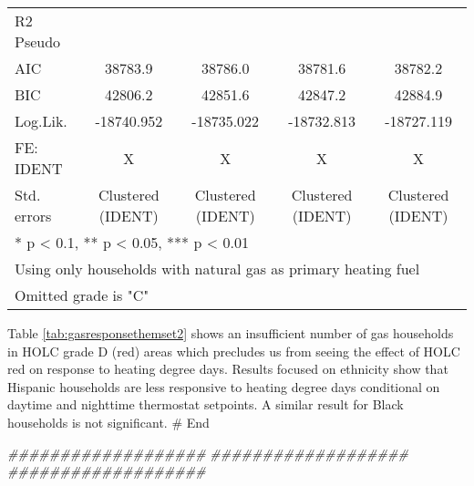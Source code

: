 \documentclass[
]{article}
\newenvironment{Shaded}{\begin{snugshade}}{\end{snugshade}}
\newcommand{\CommentTok}[1]{\textcolor[rgb]{0.56,0.35,0.01}{\textit{#1}}}
\begin{document}
\begin{table}
{\begin{tabular}[t]{lcccc}
R2 Pseudo &  &  &  & \\
AIC & 38783.9 & 38786.0 & 38781.6 & 38782.2\\
BIC & 42806.2 & 42851.6 & 42847.2 & 42884.9\\
Log.Lik. & -18740.952 & -18735.022 & -18732.813 & -18727.119\\
FE: IDENT & X & X & X & X\\
Std. errors & Clustered (IDENT) & Clustered (IDENT) & Clustered (IDENT) & Clustered (IDENT)\\
\bottomrule
\multicolumn{5}{l}{\textsuperscript{} * p < 0.1, ** p < 0.05, *** p < 0.01}\\
\multicolumn{5}{l}{\textsuperscript{} Using only households with natural gas as primary heating fuel}\\
\multicolumn{5}{l}{\textsuperscript{} Omitted grade is "C"}\\
\end{tabular}}
\end{table}

Table \ref{tab:gasresponsethemset2} shows an insufficient number of gas
households in HOLC grade D (red) areas which precludes us from seeing
the effect of HOLC red on response to heating degree days. Results
focused on ethnicity show that Hispanic households are less responsive
to heating degree days conditional on daytime and nighttime thermostat
setpoints. A similar result for Black households is not significant. \#
End

\begin{Shaded}
\begin{Highlighting}[]
\CommentTok{###################}
\CommentTok{###################}
\CommentTok{###################}
\end{Highlighting}
\end{Shaded}
\end{document}
